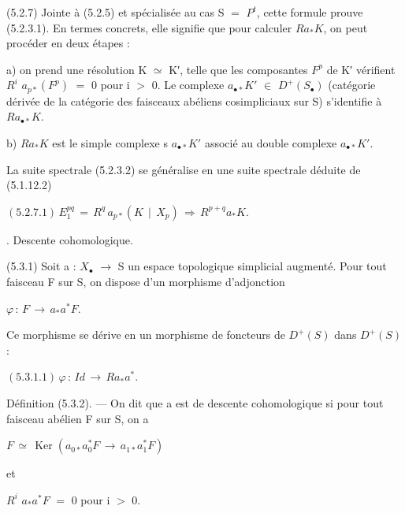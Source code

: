\documentclass[11pt,twoside]{article}
\newcommand{\DFormula}[1]{%
  \par\smallskip\noindent\hspace*{0pt}\(\displaystyle #1\)\par\smallskip
}
\begin{document}
(5.2.7) Jointe à (5.2.5) et spécialisée au cas S \(=\) \(P^{t}\), cette formule prouve (5.2.3.1). En termes concrets, elle signifie que pour calculer \(Ra_{\ast }K\), on peut procéder en deux étapes :\par
\par\medskip
a) on prend une résolution K \(\simeq \) K′, telle que les composantes \(F^{p}\) de K′ vérifient \(R^{i}\) \(a_{p\ast }(F^{p})\) \(=\) 0 pour i \(>\) 0. Le complexe \(a_{\bullet \ast }K′\) \(\in \) \(D^{+}(S_{\bullet })\) (catégorie dérivée de la catégorie des faisceaux abéliens cosimpliciaux sur S) s’identifie à \(Ra_{\bullet \ast }K\).\par
\par\medskip
b) \(Ra_{\ast }K\) est le simple complexe s \(a_{\bullet \ast }K′\) associé au double complexe \(a_{\bullet \ast }K′\).\par
\par\medskip
La suite spectrale (5.2.3.2) se généralise en une suite spectrale déduite de (5.1.12.2)\par
\par\medskip
\DFormula{(5.2.7.1)\,E_{1}^{pq}\,=\,R^{q}\,a_{p\ast }(K\,\mid \,X_{p})\,\Rightarrow \,R^{p+q}a_{\ast }K.}
\par{}. Descente cohomologique.\par
\par\medskip
(5.3.1) Soit a : \(X_{\bullet }\) \(\to \) S un espace topologique simplicial augmenté. Pour tout faisceau F sur S, on dispose d’un morphisme d’adjonction\par
\par\medskip
\DFormula{\varphi \,:\,F\,\to \,a_{\ast }a^{\ast }F.}
\par\medskip
Ce morphisme se dérive en un morphisme de foncteurs de \(D^{+}(S)\) dans \(D^{+}(S)\) :\par
\par\medskip
\DFormula{(5.3.1.1)\,\varphi \,:\,Id\,\to \,Ra_{\ast }a^{\ast }.}
\par\medskip
Définition (5.3.2). — On dit que a est de descente cohomologique si pour tout faisceau abélien F sur S, on a\par
\par\medskip
\DFormula{F\,\simeq \,\operatorname{Ker}(a_{0\ast }a_{0}^{\ast }F\,\to \,a_{1\ast }a_{1}^{\ast }F)}
\par\medskip
et\par
\par\medskip
\(R^{i}\) \(a_{\ast }a^{\ast }F\) \(=\) 0   pour i \(>\) 0.\par
\end{document}
